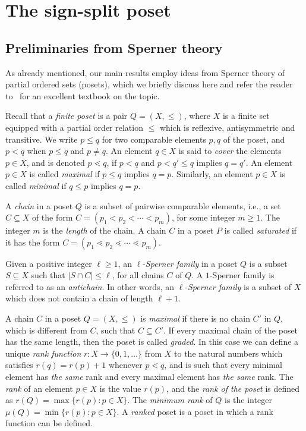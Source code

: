 \documentclass[11pt]{article}
\begin{document}
\section{The sign-split poset}

\subsection{Preliminaries from Sperner theory}
\label{sec:sperner}

As already mentioned, 
our main results employ ideas from Sperner theory of partial ordered sets (posets), which we briefly discuss here and refer the reader to~\cite{Engel} for an excellent textbook on the topic.

Recall that a \emph{finite poset} is a pair $Q=(X,\le)$, where $X$ is a finite set equipped with a partial order relation $\le$ which is  reflexive, antisymmetric and transitive. We write $p\le q$ for two comparable elements $p,q$ of the poset, and $p < q$ when $p\le q$ and $p\neq q$. 
An element $q\in X$ is said to \emph{cover} the elements $p\in X$, and is denoted $p\lessdot q$, if 
$p<q$ and $p < q'\le q$ implies $q=q'$. 
An element $p\in X$ is called \emph{maximal} if $p\le q$ implies $q=p$. 
Similarly, an element $p\in X$ is called \emph{minimal} if $q\le p$ implies $q=p$.

A \emph{chain} in a poset $Q$ is a subset of pairwise comparable elements, i.e., a set $C\subseteq X$ of the form 
$C = (p_1 < p_2< \cdots < p_m)$, for some integer $m\ge 1$. 
The integer $m$ is the \emph{length} of the chain. 
A chain $C$ in a poset $P$ is called \emph{saturated} if it has the form $C = (p_1 \lessdot p_2\lessdot \cdots \lessdot p_m)$. 
  
Given a positive integer $\ell\ge 1$, an $\ell$-\emph{Sperner family} in a poset $Q$ is a subset $S\subseteq X$ such that $|S\cap C|\le \ell$, for all chains $C$ of $Q$.  A $1$-Sperner family is referred to as an \emph{antichain}. 
In other words, an $\ell$-\emph{Sperner family} is a subset of $X$ which does not contain a chain of length $\ell+1$. 

A chain $C$ in a poset $Q=(X,\le)$ is \emph{maximal} if there is no chain $C'$ in $Q$, which is different from $C$,  such that $C\subseteq C'$. 
If every maximal chain of the poset has the same length, then the poset is called \emph{graded}. In this case we can define a unique \emph{rank function}  $r:X\to \{0,1,\ldots\}$ from $X$ to the natural numbers which satisfies   
$r(q)=r(p)+1$ whenever $p\lessdot q$, and is such that  every minimal element has \emph{the same} rank and every maximal element has \emph{the same} rank. The \emph{rank} of an element $p\in X$ is the value $r(p)$, and the \emph{rank of the poset} is defined as $r(Q)= \max\{r(p): p\in X\}$. The \emph{minimum rank} of $Q$ is the integer 
$\mu(Q) = \min\{r(p): p\in X\}$. A \emph{ranked} poset is a poset in which a rank function can be defined. 
\end{document}
